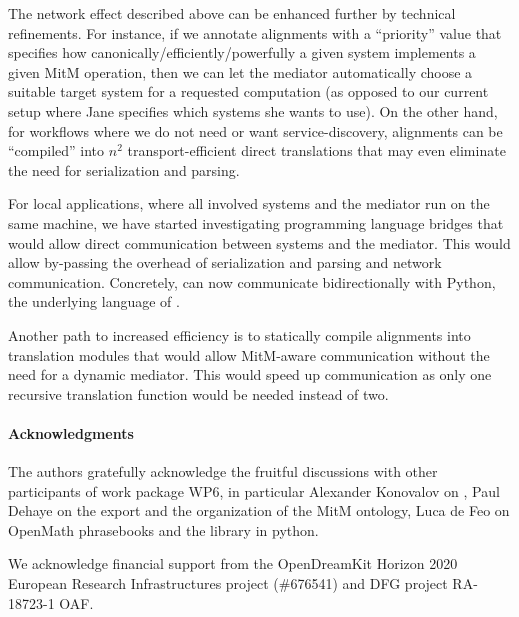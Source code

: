 The network effect described above can be enhanced further by technical refinements.
For instance, if we annotate alignments with a ``priority'' value that specifies how canonically/efficiently/powerfully a given system implements a given MitM operation, then we can let the \MMT mediator automatically choose a suitable target system for a requested computation (as opposed to our current setup where Jane specifies which systems she wants to use).
On the other hand, for workflows where we do not need or want service-discovery, alignments can be ``compiled'' into $n^2$ transport-efficient direct translations that may even eliminate the need for serialization and parsing.

For local applications, where all involved systems and the mediator run on the same machine, we have started investigating programming language bridges that would allow direct communication between systems and the \MMT mediator.
This would allow by-passing the overhead of serialization and parsing and network communication.
Concretely, \MMT can now communicate bidirectionally with Python, the underlying language of \Sage.

Another path to increased efficiency is to statically compile alignments into translation modules that would allow MitM-aware communication without the need for a dynamic mediator.
This would speed up communication as only one recursive translation function would be needed instead of two.

\paragraph*{Acknowledgments}
The authors gratefully acknowledge the fruitful discussions with other participants of
work package WP6, in particular Alexander Konovalov on \SCSCP, Paul Dehaye on the \Sage
export and the organization of the MitM ontology, Luca de Feo on OpenMath phrasebooks
and the \SCSCP library in python.

We acknowledge financial support from the OpenDreamKit Horizon 2020 European Research
Infrastructures project (\#676541) and DFG project RA-18723-1 OAF.


